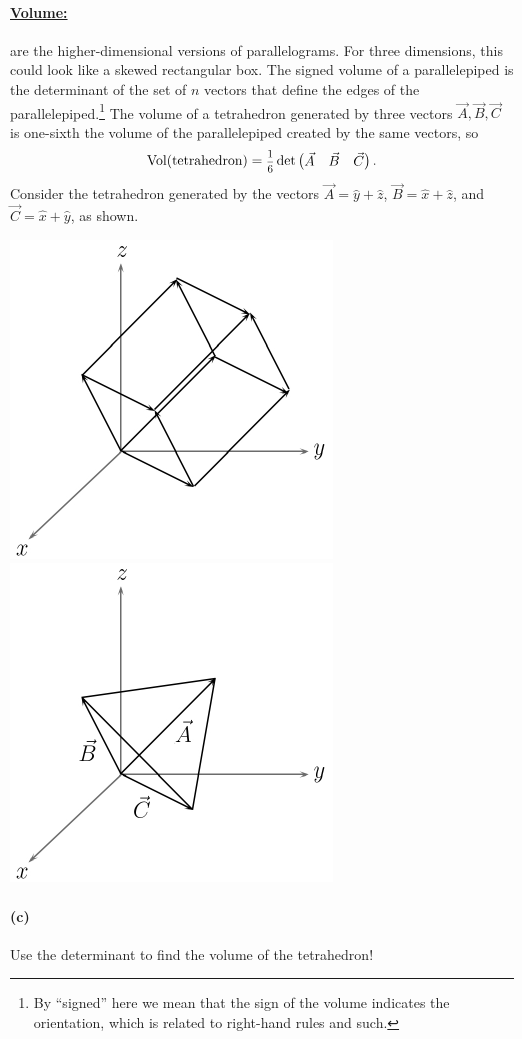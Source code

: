 \documentclass{article}
\begin{document}
\phline
\paragraph{\ul{Volume:}}
 are the higher-dimensional versions of parallelograms.  For three dimensions, this could look like a skewed rectangular box.
The signed volume of a parallelepiped is the determinant of the set of $n$ vectors that define the edges of the parallelepiped.\footnote{By ``signed'' here we mean that the sign of the volume 
indicates the orientation, which is related to right-hand rules and such.}
The volume of a tetrahedron generated by three vectors $\vec{A},\vec{B},\vec{C}$ is one-sixth the volume of the parallelepiped created by the same vectors, so
	\begin{equation*}
		\textrm{Vol(tetrahedron)} = \fracsm{1}{6} \det\begin{pmatrix}\vec{A}&\vec{B}&\vec{C}\end{pmatrix}.
	\end{equation*}
Consider the tetrahedron generated by the vectors $\vec{A} = \hat{y} + \hat{z}$, $\vec{B} = \hat{x}+\hat{z}$, and $\vec{C} = \hat{x}+\hat{y}$, as shown.
	\begin{center}	
		\includegraphics[width = .3\textwidth]{89-PS4-P2-Parallelepiped}	\qquad\qquad \includegraphics[width = .3\textwidth]{89-PS4-P2-Tetrahedron}
	\end{center}


\paragraph{(c)}
Use the determinant to find the volume of the tetrahedron!  
\\
\end{document}

